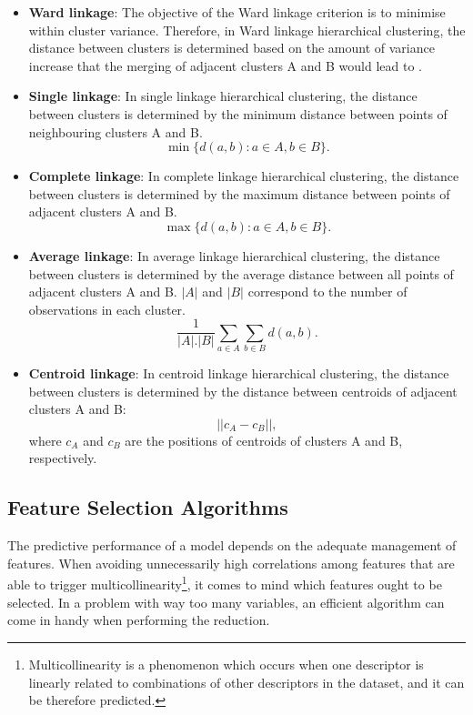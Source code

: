 \begin{itemize}
    \item \textbf{Ward linkage}: The objective of the Ward linkage criterion is to minimise within cluster variance. Therefore, in Ward linkage hierarchical clustering, the distance between clusters is determined based on the amount of variance increase that the merging of adjacent clusters A and B would lead to \cite{ward}.
    \item \textbf{Single linkage}: In single linkage hierarchical clustering, the distance between clusters is determined by the minimum distance between points of neighbouring clusters A and B.
    $$
    \min \{ d(a, b): a \in A, b \in B \}.
    $$
    \item \textbf{Complete linkage}: In complete linkage hierarchical clustering, the distance between clusters is determined by the maximum distance between points of adjacent clusters A and B.
    $$
    \max \{ d(a, b): a \in A, b \in B \}.
    $$
    \item \textbf{Average linkage}: In average linkage hierarchical clustering, the distance between clusters is determined by the average distance between all points of adjacent clusters A and B. $|A|$ and $|B|$ correspond to the number of observations in each cluster.
    $$
    \frac {1}{|A|.|B|}\sum_{a \in A}\sum_{b \in B}d(a, b).
    $$
    \item \textbf{Centroid linkage}: In centroid linkage hierarchical clustering, the distance between clusters is determined by the distance between centroids of adjacent clusters A and B:
    $$|
    |c_{A} - c_{B}||,
    $$
    where $c_{A}$ and $c_{B}$ are the positions of centroids of clusters A and B, respectively.
\end{itemize}\hspace{15cm}\cite{hastie01statisticallearning}

\subsection{Feature Selection Algorithms}
The predictive performance of a model depends on the adequate management of features. When avoiding unnecessarily high correlations among features that are able to trigger multicollinearity\footnote{Multicollinearity is a phenomenon which occurs when one descriptor is linearly related to combinations of other descriptors in the dataset, and it can be therefore predicted.}, it comes to mind which features ought to be selected. In a problem with way too many variables, an efficient algorithm can come in handy when performing the reduction.
